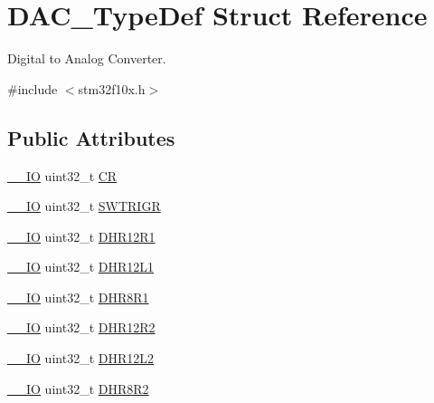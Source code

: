 \hypertarget{struct_d_a_c___type_def}{}\section{D\+A\+C\+\_\+\+Type\+Def Struct Reference}
\label{struct_d_a_c___type_def}


Digital to Analog Converter.  




{\ttfamily \#include $<$stm32f10x.\+h$>$}

\subsection*{Public Attributes}
\begin{DoxyCompactItemize}
\item 
\hyperlink{core__sc300_8h_aec43007d9998a0a0e01faede4133d6be}{\+\_\+\+\_\+\+IO} uint32\+\_\+t \hyperlink{struct_d_a_c___type_def_a394324f0b573837ca15a87127b2a37ea}{CR}
\item 
\hyperlink{core__sc300_8h_aec43007d9998a0a0e01faede4133d6be}{\+\_\+\+\_\+\+IO} uint32\+\_\+t \hyperlink{struct_d_a_c___type_def_a4ccb66068a1ebee1179574dda20206b6}{S\+W\+T\+R\+I\+GR}
\item 
\hyperlink{core__sc300_8h_aec43007d9998a0a0e01faede4133d6be}{\+\_\+\+\_\+\+IO} uint32\+\_\+t \hyperlink{struct_d_a_c___type_def_afbfd2855cdb81939b4efc58e08aaf3e5}{D\+H\+R12\+R1}
\item 
\hyperlink{core__sc300_8h_aec43007d9998a0a0e01faede4133d6be}{\+\_\+\+\_\+\+IO} uint32\+\_\+t \hyperlink{struct_d_a_c___type_def_a5eb63912e39085e3e13d64bdb0cf38bd}{D\+H\+R12\+L1}
\item 
\hyperlink{core__sc300_8h_aec43007d9998a0a0e01faede4133d6be}{\+\_\+\+\_\+\+IO} uint32\+\_\+t \hyperlink{struct_d_a_c___type_def_a3a382d341fb608a04390bacb8c00b0f0}{D\+H\+R8\+R1}
\item 
\hyperlink{core__sc300_8h_aec43007d9998a0a0e01faede4133d6be}{\+\_\+\+\_\+\+IO} uint32\+\_\+t \hyperlink{struct_d_a_c___type_def_ab1f777540c487c26bf27e6fa37a644cc}{D\+H\+R12\+R2}
\item 
\hyperlink{core__sc300_8h_aec43007d9998a0a0e01faede4133d6be}{\+\_\+\+\_\+\+IO} uint32\+\_\+t \hyperlink{struct_d_a_c___type_def_a9f612b6b3e065e810e5a2fb254d6a40b}{D\+H\+R12\+L2}
\item 
\hyperlink{core__sc300_8h_aec43007d9998a0a0e01faede4133d6be}{\+\_\+\+\_\+\+IO} uint32\+\_\+t \hyperlink{struct_d_a_c___type_def_a3b096b71656f8fb32cd18b4c8b1d2334}{D\+H\+R8\+R2}

\end{DoxyCompactItemize}
